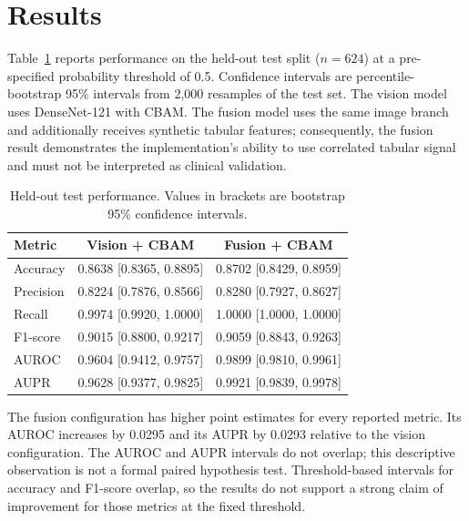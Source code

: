 
\section{Results}
\label{sec:results}

Table~\ref{tab:final-metrics} reports performance on the held-out test split
($n=624$) at a pre-specified probability threshold of 0.5. Confidence intervals
are percentile-bootstrap 95\% intervals from 2,000 resamples of the test set.
The vision model uses DenseNet-121 with CBAM. The fusion model uses the same
image branch and additionally receives synthetic tabular features; consequently,
the fusion result demonstrates the implementation's ability to use correlated
tabular signal and must not be interpreted as clinical validation.

\begin{table}[htbp]
\centering
\caption{Held-out test performance. Values in brackets are bootstrap 95\%
confidence intervals.}
\label{tab:final-metrics}
\small
\begin{tabular}{lcc}
\toprule
Metric & Vision + CBAM & Fusion + CBAM \\
\midrule
Accuracy  & 0.8638 [0.8365, 0.8895] & 0.8702 [0.8429, 0.8959] \\
Precision & 0.8224 [0.7876, 0.8566] & 0.8280 [0.7927, 0.8627] \\
Recall    & 0.9974 [0.9920, 1.0000] & 1.0000 [1.0000, 1.0000] \\
F1-score  & 0.9015 [0.8800, 0.9217] & 0.9059 [0.8843, 0.9263] \\
AUROC     & 0.9604 [0.9412, 0.9757] & 0.9899 [0.9810, 0.9961] \\
AUPR      & 0.9628 [0.9377, 0.9825] & 0.9921 [0.9839, 0.9978] \\
\bottomrule
\end{tabular}
\end{table}

The fusion configuration has higher point estimates for every reported metric.
Its AUROC increases by 0.0295 and its AUPR by 0.0293 relative to the vision
configuration. The AUROC and AUPR intervals do not overlap; this descriptive
observation is not a formal paired hypothesis test. Threshold-based intervals
for accuracy and F1-score overlap, so the results do not support a strong claim
of improvement for those metrics at the fixed threshold.

